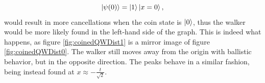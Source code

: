 \documentclass[../../dissertation.tex]{subfiles}
\begin{document}
\begin{equation}
	\ket{\psi(0)} = \ket{1}\ket{x=0},
	\label{eq:coinedQWInitCond1}
\end{equation}
would result in more cancellations when the coin state is $\ket{0}$, thus the
walker would be more likely found in the left-hand side of the graph. This is
indeed what happens, as figure \ref{fig:coinedQWDist1} is a mirror image of
figure \ref{fig:coinedQWDist0}. The walker still moves away from the origin
with ballistic behavior, but in the opposite direction. The peaks behave in a
similar fashion, being instead found at $x \approx -\frac{t}{\sqrt{2}}$.\par
\end{document}
